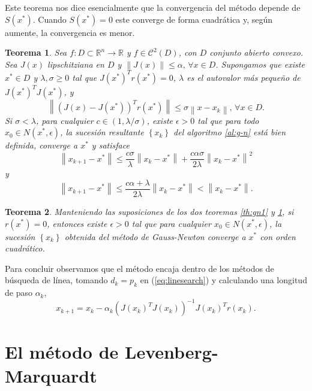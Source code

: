 \documentclass[11pt,a4paper]{book}
\newtheorem{theorem}{Teorema}[chapter]
\theoremstyle{definition}
\theoremstyle{remark}
\newcommand{\norm}[1]{\left\lVert#1\right\rVert}
\newcommand{\sucesionxk}{\left\{x_k\right\}}
\begin{document}
Este teorema nos dice esencialmente que la convergencia del método depende de $S(x^*)$. Cuando $S(x^*)=0$ este converge de forma cuadrática y, según aumente, la convergencia es menor.

\begin{theorem}
	\label{th:gn2}
	Sea $f:D \subset \mathbb{R}^n \rightarrow \mathbb{R}$ y $f \in \mathcal{C}^2(D)$, con $D$ conjunto abierto convexo. Sea $J(x)$ lipschitziana en $D$ y $\norm{J(x)} \leq \alpha, \, \forall x \in D$. Supongamos que existe $x^* \in D$ y $\lambda, \sigma \geq 0$ tal que $J(x^*)^Tr(x^*)=0$,
$\lambda$ es el autovalor más pequeño de $J(x^*)^TJ(x^*)$, y
	\begin{equation}
		\norm{(J(x)-J(x^*))^Tr(x^*)} \leq \sigma \norm{x-x_k},\,\forall x \in D.
	\end{equation}
	Si $\sigma < \lambda$, para cualquier $c\in (1,\lambda / \sigma)$, existe $\epsilon > 0$ tal que para todo $x_0 \in N(x^*, \epsilon)$, la sucesión resultante $\sucesionxk$ del algoritmo \ref{al:g-n} está bien definida, converge a $x^*$ y satisface
	\begin{equation}
	\norm{x_{k+1}-x^*} \leq \frac{c\sigma}{\lambda} \norm{x_k-x^*}+\frac{c\alpha\sigma}{2\lambda}\norm{x_k-x^*}^2
	\end{equation}
	y
	\begin{equation}
	\norm{x_{k+1}-x^*} \leq \frac{c\alpha+\lambda}{2\lambda}\norm{x_k-x^*} < \norm{x_k-x^*}.
	\end{equation}
\end{theorem}

\begin{theorem}
	Manteniendo las suposiciones de los dos teoremas \ref{th:gn1} y \ref{th:gn2}, si $r(x^*)=0$, entonces existe $\epsilon>0$ tal que para cualquier $x_0 \in N(x^*,\epsilon)$, la sucesión $\sucesionxk$ obtenida del método de Gauss-Newton converge a $x^*$ con orden cuadrático.
\end{theorem}

Para concluir observamos que el método encaja dentro de los métodos de búsqueda de línea, tomando $d_k=p_k$ en  (\ref{eq:linesearch}) y calculando una longitud de paso $\alpha_k$,
\begin{equation}
	x_{k+1} = x_k-\alpha_k(J(x_k)^TJ(x_k))^{-1}J(x_k)^Tr(x_k).
\end{equation}

\chapter{El método de Levenberg-Marquardt}
\end{document}
